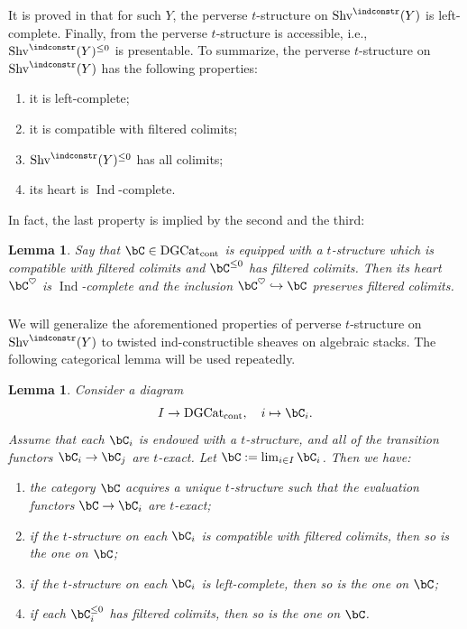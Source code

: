 \documentclass[10pt]{amsart}
\newcommand{\sssec}{\subsubsection}
\newtheorem{lemma}[subsubsection]{Lemma}
\theoremstyle{remark}
\newcommand{\on}{\operatorname}
\newcommand{\DGcat}{\on{DGCat}_{\on{cont}}}
\newcommand{\Shv}{\on{Shv}}
\DeclareMathOperator{\Ind}{Ind}
\begin{document}
It is proved in \cite[Sect. E.1]{AGKRRV} that for such $Y$, the perverse $t$-structure on $\Shv^{\indconstr}(Y)$ is left-complete. Finally, from \cite[Proposition 2.13]{AGH} the perverse $t$-structure is accessible, i.e., $\Shv^{\indconstr}(Y)^{\le 0}$ is presentable.
To summarize, the perverse $t$-structure on $\Shv^{\indconstr}(Y)$ has the following properties:
\begin{enumerate}
    \item it is left-complete;
    \item it is compatible with filtered colimits;
    \item $\Shv^{\indconstr}(Y)^{\le 0}$ has all colimits; 
    \item its heart is $\Ind$-complete.
\end{enumerate}
In fact, the last property is implied by the second and the third:

\begin{lemma}\label{lem: heart Ind complete}
    Say that $\bC\in\DGcat$ is equipped with a $t$-structure which is compatible with filtered colimits and $\bC^{\le 0}$ has filtered colimits. Then its heart $\bC^{\heartsuit}$ is $\Ind$-complete and the inclusion $\bC^{\heartsuit}\hookrightarrow \bC$ preserves filtered colimits.
\end{lemma}

\sssec{}
We will generalize the aforementioned properties of perverse $t$-structure on $\Shv^{\indconstr}(Y)$ to twisted ind-constructible sheaves on algebraic stacks. The following categorical lemma will be used repeatedly.

\begin{lemma}\label{lem: limit t str}
    Consider a diagram
    \[I\rightarrow \DGcat,\quad i\mapsto \bC_i.\] Assume that each $\bC_i$ is endowed with a $t$-structure, and all of the transition functors $\bC_i\rightarrow \bC_j$ are $t$-exact. Let $\bC:=\lim_{i\in I} \bC_i$. Then we have:
    \begin{enumerate}
        \item the category $\bC$ acquires a unique $t$-structure such that the evaluation functors $\bC\rightarrow \bC_i$ are $t$-exact;
        \item if the $t$-structure on each $\bC_i$ is compatible with filtered colimits, then so is the one on $\bC$;
        \item if the $t$-structure on each $\bC_i$ is left-complete, then so is the one on $\bC$;
        \item if each $\bC^{\le 0}_i$ has filtered colimits, then so is the one on $\bC$.
    \end{enumerate}
\end{lemma}
\end{document}
